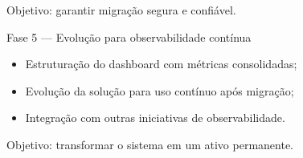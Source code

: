 Objetivo: garantir migração segura e confiável.

\vspace{0.5em}
Fase 5 — Evolução para observabilidade contínua
\begin{itemize}
    \item Estruturação do dashboard com métricas consolidadas;
    \item Evolução da solução para uso contínuo após migração;
    \item Integração com outras iniciativas de observabilidade.
\end{itemize}

Objetivo: transformar o sistema em um ativo permanente.